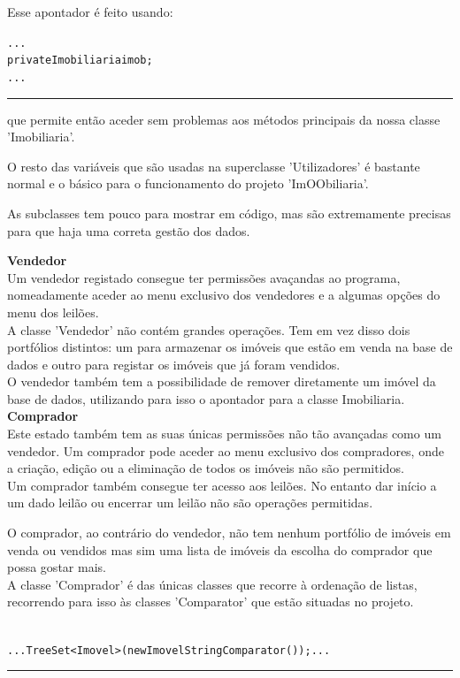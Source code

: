 \documentclass[12pt]{article}
\newenvironment{code}                    
{\textbf{
} \hspace{1cm} \hrulefill \\ 
\smallskip 
\begin{center}
\begin{minipage}{0.9\textwidth} 
\begin{alltt}\small}
{\end{alltt}
\end{minipage}
\end{center}
\hrule\smallskip
}
\begin{document}
Esse apontador é feito usando:
\newline
\begin{code}
...
    private Imobiliaria imob;
...
\end{code}
que permite então aceder sem problemas aos métodos principais da nossa classe 'Imobiliaria'.
\newline

O resto das variáveis que são usadas na superclasse 'Utilizadores' é bastante normal e o básico para o funcionamento do projeto 'ImOObiliaria'.
\newline

As subclasses tem pouco para mostrar em código, mas são extremamente precisas para que haja uma correta gestão dos dados.
\pagebreak

\textbf{Vendedor}
~\\

Um vendedor registado consegue ter permissões avaçandas ao programa, nomeadamente aceder ao menu exclusivo dos vendedores e a algumas opções do menu dos leilões. \\

A classe 'Vendedor' não contém grandes operações. Tem em vez disso dois portfólios distintos: um para armazenar os imóveis que estão em venda na base de dados e outro para registar os imóveis que já foram vendidos.
~\\

O vendedor também tem a possibilidade de remover diretamente um imóvel da base de dados, utilizando para isso o apontador para a classe Imobiliaria.
~\\

\textbf{Comprador}
~\\

Este estado também tem as suas únicas permissões não tão avançadas como um vendedor. Um comprador pode aceder ao menu exclusivo dos compradores, onde a criação, edição ou a eliminação de todos os imóveis não são permitidos.
\\

Um comprador também consegue ter acesso aos leilões. No entanto dar início a um dado leilão ou encerrar um leilão não são operações permitidas.

O comprador, ao contrário do vendedor, não tem nenhum portfólio de imóveis em venda ou vendidos mas sim uma lista de imóveis da escolha do comprador que possa gostar mais.
\\

A classe 'Comprador' é das únicas classes que recorre à ordenação de listas, recorrendo para isso às classes 'Comparator' que estão situadas no projeto.
~\\
\newline
\begin{code}
... TreeSet <Imovel> (new ImovelStringComparator ()); ...
\end{code}
~\\
\end{document}
